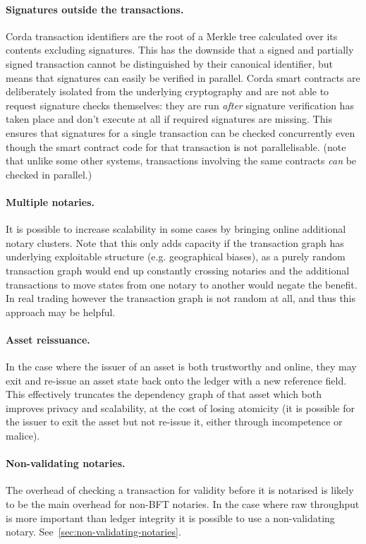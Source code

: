 \documentclass{article}
\begin{document}
\paragraph{Signatures outside the transactions.}Corda transaction identifiers are the root of a Merkle tree
calculated over its contents excluding signatures. This has the downside that a signed and partially signed
transaction cannot be distinguished by their canonical identifier, but means that signatures can easily be verified
in parallel. Corda smart contracts are deliberately isolated from the underlying cryptography and are not able to
request signature checks themselves: they are run \emph{after} signature verification has taken place and don't
execute at all if required signatures are missing. This ensures that signatures for a single transaction can be
checked concurrently even though the smart contract code for that transaction is not parallelisable. (note that
unlike some other systems, transactions involving the same contracts \emph{can} be checked in parallel.)

\paragraph{Multiple notaries.}It is possible to increase scalability in some cases by bringing online additional
notary clusters. Note that this only adds capacity if the transaction graph has underlying exploitable structure
(e.g. geographical biases), as a purely random transaction graph would end up constantly crossing notaries and the
additional transactions to move states from one notary to another would negate the benefit. In real trading however
the transaction graph is not random at all, and thus this approach may be helpful.

\paragraph{Asset reissuance.}In the case where the issuer of an asset is both trustworthy and online, they may exit
and re-issue an asset state back onto the ledger with a new reference field. This effectively truncates the
dependency graph of that asset which both improves privacy and scalability, at the cost of losing atomicity (it is
possible for the issuer to exit the asset but not re-issue it, either through incompetence or malice).

\paragraph{Non-validating notaries.}The overhead of checking a transaction for validity before it is notarised is
likely to be the main overhead for non-BFT notaries. In the case where raw throughput is more important than ledger
integrity it is possible to use a non-validating notary. See~\cref{sec:non-validating-notaries}.
\end{document}

